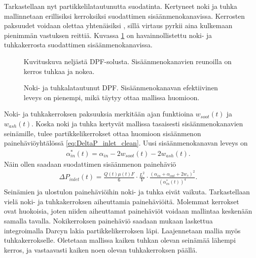 Tarkastellaan nyt partikkelilatautunutta suodatinta.
Kertyneet noki ja tuhka mallinnetaan erillisiksi kerroksiksi suodattimen sisäänmenokanavissa. Kerrosten paksuudet voidaan  olettaa yhtenäisiksi \cite{Konstandopoulos2000}, sillä virtaus pyrkii aina kulkemaan pienimmän vastuksen reittiä. Kuvassa \ref{fig:hac_dpf_loaded} on havainnollistettu noki- ja tuhkakerrosta suodattimen sisäänmenokanavissa.
\begin{figure}[H]
    \centering 
               {Kuvituskuva neljästä DPF-solusta. Sisäänmenokanavien reunoilla on kerros tuhkaa ja nokea.}
    \caption{Noki- ja tuhkalatautunut DPF. Sisäänmenokanavan efektiivinen leveys on pienempi, mikä täytyy ottaa mallissa huomioon.}
    \label{fig:hac_dpf_loaded}
\end{figure}
Noki- ja tuhkakerroksen paksuuksia merkitään ajan funktioina \(w_{soot}(t)\) ja \(w_{ash}(t)\).
Koska noki ja tuhka kertyvät mallissa tasaisesti sisäänmenokanavien seinämille, tulee partikkelikerrokset ottaa huomioon sisäänmenon painehäviöyhtälössä \eqref{eq:DeltaP_inlet_clean}. Uusi sisäänmenokanavan leveys on 
\begin{align}
    \alpha_{in}^*(t) = \alpha_{in} -2w_{soot}(t)-2w_{ash}(t).
\end{align}
Näin ollen saadaan suodattimen sisäänmenon painehäviö
\begin{align}
    \Delta P_{inlet}(t) = \frac{Q(t) \mu(t) F}{6}\cdot \frac{L^2}{V} \cdot \frac{(\alpha_{in}+\alpha_{out}+2 w_s)^2}{(\alpha_{in}^*(t))^4}.
    \label{eq:PDinletchannel}
\end{align}
Seinämien ja ulostulon painehäviöihin noki- ja tuhka eivät vaikuta. 
Tarkastellaan vielä noki- ja tuhkakerroksen aiheuttamia painehäviöitä. Molemmat kerrokset ovat huokoisia, joten niiden aiheuttamat painehäviöt voidaan mallintaa keskenään samalla tavalla. Nokikerroksen painehäviö saadaan \cite{Konstandopoulos2000} mukaan laskettua integroimalla Darcyn lakia partikkelikerroksen läpi. Laajennetaan mallia myös tuhkakerrokselle. Oletetaan mallissa kaiken tuhkan olevan seinämää lähempi kerros, ja vastaavasti kaiken noen olevan tuhkakerroksen päällä.

